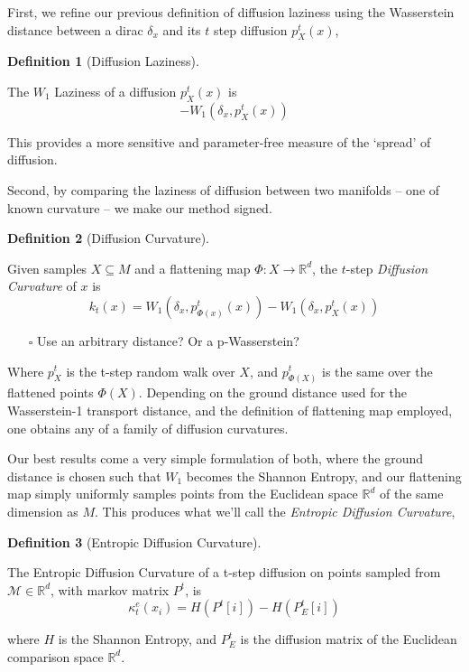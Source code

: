 \documentclass[
  letterpaper,
  DIV=11,
  numbers=noendperiod]{scrartcl}
\providecommand{\tightlist}{%
  \setlength{\itemsep}{0pt}\setlength{\parskip}{0pt}}\usepackage{longtable,booktabs,array}
\theoremstyle{plain}
\theoremstyle{plain}
\theoremstyle{definition}
\theoremstyle{definition}
\newtheorem{definition}{Definition}[section]
\theoremstyle{remark}
\begin{document}
First, we refine our previous definition of diffusion laziness using the
Wasserstein distance between a dirac \(\delta_{x}\) and its \(t\) step
diffusion \(p_{X}^t(x)\),

\begin{definition}[Diffusion
Laziness]\protect\hypertarget{def-laziness-of-diffusion}{}\label{def-laziness-of-diffusion}

The \(W_1\) Laziness of a diffusion \(p_{X}^t(x)\) is \[
- W_1\left(\delta_x, p_X^t(x)\right)
\]

\end{definition}

This provides a more sensitive and parameter-free measure of the
`spread' of diffusion.

Second, by comparing the laziness of diffusion between two manifolds --
one of known curvature -- we make our method signed.

\begin{definition}[Diffusion
Curvature]\protect\hypertarget{def-diffusion-curvature}{}\label{def-diffusion-curvature}

Given samples \(X \subseteq M\) and a flattening map
\(\Phi: X \rightarrow \mathbb{R}^d\), the \(t\)-step \emph{Diffusion
Curvature} of \(x\) is \[
k_t(x)=W_1\left(\delta_x, p_{\Phi(x)}^t(x)\right) - W_1\left(\delta_x, p_X^t(x)\right)
\]

\end{definition}

\begin{itemize}
\tightlist
\item[$\square$]
  Use an arbitrary distance? Or a p-Wasserstein?
\end{itemize}

Where \(p_X^t\) is the t-step random walk over \(X\), and
\(p_{\Phi(X)}^t\) is the same over the flattened points \(\Phi(X)\).
Depending on the ground distance used for the Wasserstein-1 transport
distance, and the definition of flattening map employed, one obtains any
of a family of diffusion curvatures.

Our best results come a very simple formulation of both, where the
ground distance is chosen such that \(W_{1}\) becomes the Shannon
Entropy, and our flattening map simply uniformly samples points from the
Euclidean space \(\mathbb{R}^d\) of the same dimension as \(M\). This
produces what we'll call the \emph{Entropic Diffusion Curvature},

\begin{definition}[Entropic Diffusion
Curvature]\protect\hypertarget{def-entropic-diffusion-curvature}{}\label{def-entropic-diffusion-curvature}

The Entropic Diffusion Curvature of a t-step diffusion on points sampled
from \(\mathcal{M} \in \mathbb{R}^d\), with markov matrix \(P^t\), is \[
\kappa^e_{t}(x_{i}) = H(P^t[i]) - H(P_{E}^t[i])
\]

where \(H\) is the Shannon Entropy, and \(P_{E}^t\) is the diffusion
matrix of the Euclidean comparison space \(\mathbb{R}^d\).

\end{definition}
\end{document}
